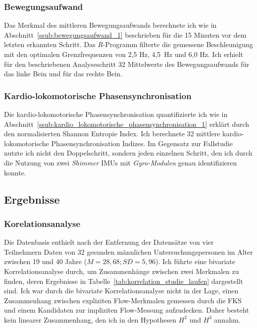 \subsubsection{Bewegungsaufwand}
Das Merkmal des mittleren Bewegungsaufwands berechnete ich wie in Abschnitt~\ref{ssub:bewegungsaufwand_1} beschrieben für die 15 Minuten vor dem letzten erkannten Schritt. Das \emph{R}-Programm filterte die gemessene Beschleunigung mit den optimalen Grenzfrequenzen von 2,5 Hz, 4,5~Hz und 6,0 Hz. Ich erhielt für den beschriebenen Analyseschritt 32 Mittelwerte des Bewegungsaufwands für das linke Bein und für das rechte Bein.

\subsubsection{Kardio-lokomotorische Phasensynchronisation}
Die kardio-lokomotorische Phasensynchronisation quantifizierte ich wie in Abschnitt~\ref{ssub:kardio_lokomotorische_phasensynchronisation_1} erklärt durch den normalisierten Shannon Entropie Index. Ich berechnete 32 mittlere kardio-lokomotorische Phasensynchronisation Indizes. Im Gegensatz zur Fallstudie nutzte ich nicht den Doppelschritt, sondern jeden einzelnen Schritt, den ich durch die Nutzung von zwei \emph{Shimmer} \acp{IMU} mit \emph{Gyro-Modulen} genau identifizieren konnte.

\subsection{Ergebnisse}

\subsubsection{Korelationsanalyse}
Die Datenbasis enthielt nach der Entfernung der Datensätze von vier Teilnehmern Daten von 32 gesunden männlichen Untersuchungspersonen im Alter zwischen 19 und 40 Jahre ($M = 28{,}68; SD = 5{,}96$). Ich führte eine bivariate Korrelationsanalyse durch, um Zusammenhänge zwischen zwei Merkmalen zu finden, deren Ergebnisse in Tabelle~\ref{tab:korrelation_studie_laufen} dargestellt sind. Ich war durch die bivariate Korrelationsanalyse nicht in der Lage, einen Zusammenhang zwischen expliziten Flow-Merkmalen gemessen durch die \ac{FKS} und einem Kandidaten zur impliziten Flow-Messung aufzudecken. Daher besteht kein linearer Zusammenhang, den ich in den Hypothesen $H^2$ und $H^3$ annahm.

